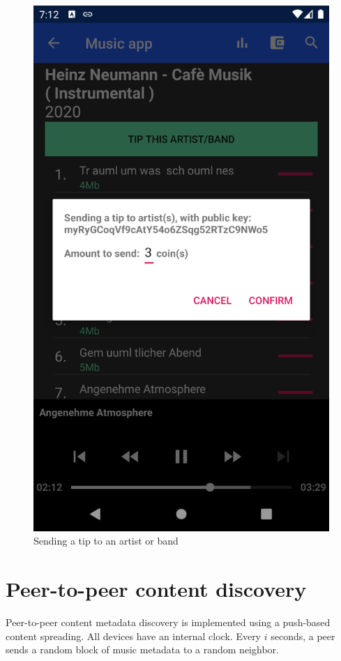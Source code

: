 \begin{figure}[]
        \includegraphics[width=1\linewidth]{implementation/send-tip}
        \caption{Sending a tip to an artist or band}
        \label{fig:tip-artist}
    \endminipage
\end{figure}

\section{Peer-to-peer content discovery}
Peer-to-peer content metadata discovery is implemented using a push-based content spreading. All devices have an internal clock. Every $i$ seconds, a peer sends a random block of music metadata to a random neighbor. 

